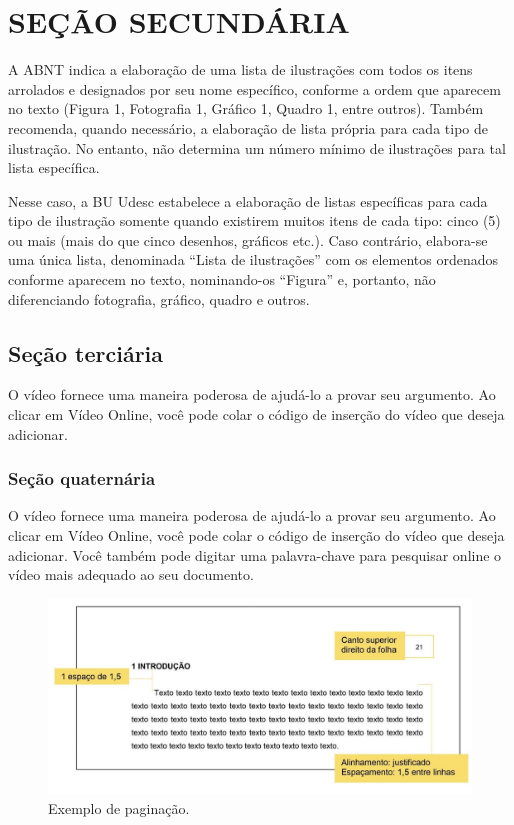 \section{SEÇÃO SECUNDÁRIA}

A ABNT indica a elaboração de uma lista de ilustrações com todos os itens arrolados e designados por seu nome específico, conforme a ordem que aparecem no texto (Figura 1, Fotografia 1, Gráfico 1, Quadro 1, entre outros). Também recomenda, quando necessário, a elaboração de lista própria para cada tipo de ilustração. No entanto, não determina um número mínimo de ilustrações para tal lista específica.

Nesse caso, a BU Udesc estabelece a elaboração de listas específicas para cada tipo de ilustração somente quando existirem muitos itens de cada tipo: cinco (5) ou mais (mais do que cinco desenhos, gráficos etc.). Caso contrário, elabora-se uma única lista, denominada “Lista de ilustrações” com os elementos ordenados conforme aparecem no texto, nominando-os “Figura” e, portanto, não diferenciando fotografia, gráfico, quadro e outros.


\subsection{Seção terciária}

O vídeo fornece uma maneira poderosa de ajudá-lo a provar seu argumento. Ao clicar em Vídeo Online, você pode colar o código de inserção do vídeo que deseja adicionar.

\subsubsection{Seção quaternária}

O vídeo fornece uma maneira poderosa de ajudá-lo a provar seu argumento. Ao clicar em Vídeo Online, você pode colar o código de inserção do vídeo que deseja adicionar. Você também pode digitar uma palavra-chave para pesquisar online o vídeo mais adequado ao seu documento. 


\begin{figure}
	\centering
	\caption{Exemplo de paginação.}
	\includegraphics[scale=1]{Textuais/Picture1.png}
\end{figure}


